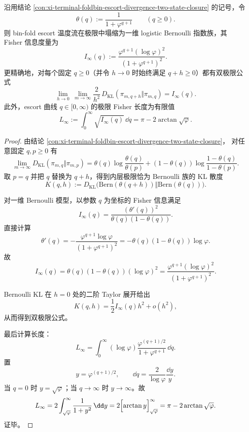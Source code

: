 \begin{theorem}\label{thm:xi-foldbin-escort-logistic-fisher-geometry}
沿用结论 \ref{con:xi-terminal-foldbin-escort-divergence-two-state-closure} 的记号，令
\[
\theta(q):=\frac{1}{1+\varphi^{q+1}}
\qquad(q\ge 0).
\]
则 bin-fold escort 温度流在极限中塌缩为一维 logistic Bernoulli 指数族，其 Fisher 信息度量为
\[
I_\infty(q)
:=
\frac{\varphi^{q+1}(\log\varphi)^2}{(1+\varphi^{q+1})^2}.
\]
更精确地，对每个固定 \(q\ge 0\)（并令 \(h\to 0\) 时始终满足 \(q+h\ge 0\)）都有双极限公式
\[
\lim_{h\to 0}\ \lim_{m\to\infty}
\frac{2}{h^2}\,
D_{\mathrm{KL}}(\pi_{m,q+h}\Vert \pi_{m,q})
=
I_\infty(q).
\]
此外，escort 曲线 \(q\in[0,\infty)\) 的极限 Fisher 长度为有限值
\[
L_\infty
:=
\int_0^\infty \sqrt{I_\infty(q)}\,\dd q
=
\pi-2\arctan\sqrt{\varphi}.
\]
\end{theorem}
\begin{proof}
由结论 \ref{con:xi-terminal-foldbin-escort-divergence-two-state-closure}，
对任意固定 \(q,p\ge 0\) 有
\[
\lim_{m\to\infty}D_{\mathrm{KL}}(\pi_{m,q}\Vert \pi_{m,p})
=
\theta(q)\log\frac{\theta(q)}{\theta(p)}
+(1-\theta(q))\log\frac{1-\theta(q)}{1-\theta(p)}.
\]
取 \(p=q\) 并把 \(q\) 替换为 \(q+h\)，得到内层极限恰为 Bernoulli 族的 KL 散度
\[
K(q,h)
:=
D_{\mathrm{KL}}\bigl(\mathrm{Bern}(\theta(q+h))\Vert \mathrm{Bern}(\theta(q))\bigr).
\]

对一维 Bernoulli 模型，以参数 \(q\) 为坐标的 Fisher 信息满足
\[
I_\infty(q)=\frac{(\theta'(q))^2}{\theta(q)(1-\theta(q))}.
\]
直接计算
\[
\theta'(q)
=
-\frac{\varphi^{q+1}\log\varphi}{(1+\varphi^{q+1})^2}
=
-\theta(q)(1-\theta(q))\log\varphi.
\]
故
\[
I_\infty(q)
=
\theta(q)(1-\theta(q))(\log\varphi)^2
=
\frac{\varphi^{q+1}(\log\varphi)^2}{(1+\varphi^{q+1})^2}.
\]

Bernoulli KL 在 \(h=0\) 处的二阶 Taylor 展开给出
\[
K(q,h)=\frac12 I_\infty(q)h^2+o(h^2),
\]
从而得到双极限公式。

最后计算长度：
\[
L_\infty
=
\int_0^\infty
(\log\varphi)\frac{\varphi^{(q+1)/2}}{1+\varphi^{q+1}}\,\dd q.
\]
置
\[
y=\varphi^{(q+1)/2},
\qquad
\dd q=\frac{2}{\log\varphi}\frac{\dd y}{y}.
\]
当 \(q=0\) 时 \(y=\sqrt\varphi\)；当 \(q\to\infty\) 时 \(y\to\infty\)。故
\[
L_\infty
=
2\int_{\sqrt\varphi}^{\infty}\frac{1}{1+y^2}\,\dd y
=
2\Bigl[\arctan y\Bigr]_{\sqrt\varphi}^{\infty}
=
\pi-2\arctan\sqrt\varphi.
\]
证毕。
\end{proof}
